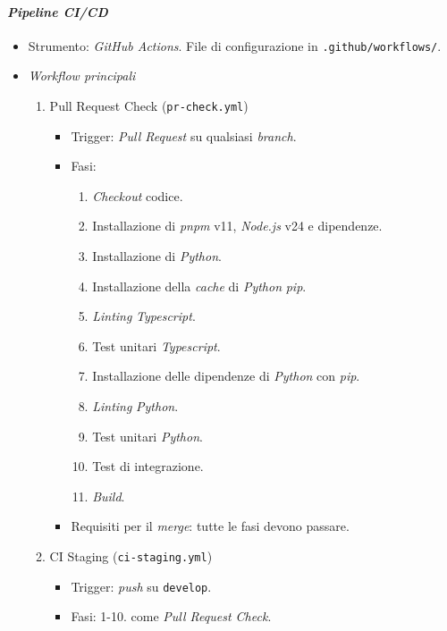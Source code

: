 \documentclass[12pt, a4paper]{article}
\begin{document}
\paragraph{\textit{Pipeline CI/CD}}
\begin{itemize}
    \item Strumento: \textit{GitHub Actions}. File di configurazione in \texttt{.github/workflows/}.
    \item \textit{Workflow principali}
    \begin{enumerate}
        \item Pull Request Check (\texttt{pr-check.yml})
        \begin{itemize}
            \item Trigger: \textit{Pull Request} su qualsiasi \textit{branch}.
            \item Fasi:
            \begin{enumerate}[label=\arabic*.]
                \item \textit{Checkout} codice.
                \item Installazione di \textit{pnpm} v11, \textit{Node.js} v24 e dipendenze.
                \item Installazione di \textit{Python}.
                \item Installazione della \textit{cache} di \textit{Python} \textit{pip}.
                \item \textit{Linting} \textit{Typescript}.
                \item Test unitari \textit{Typescript}.
                \item Installazione delle dipendenze di \textit{Python} con \textit{pip}.
                \item \textit{Linting} \textit{Python}.
                \item Test unitari \textit{Python}.
                \item Test di integrazione.
                \item \textit{Build}.
            \end{enumerate}
            \item Requisiti per il \textit{merge}: tutte le fasi devono passare.
        \end{itemize}
        \item CI Staging (\texttt{ci-staging.yml})
        \begin{itemize}
            \item Trigger: \textit{push} su \texttt{develop}.
            \item Fasi: 1-10. come \textit{Pull Request Check}.

\end{itemize}
\end{enumerate}
\end{itemize}
\end{document}
